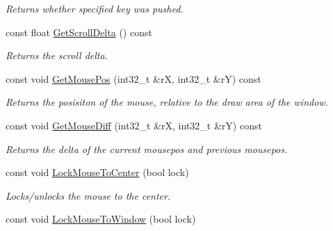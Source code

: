 \begin{DoxyCompactItemize}
\begin{DoxyCompactList}\small\item\em Returns whether specified key was pushed. \end{DoxyCompactList}\item 
const float \hyperlink{class_ensum_1_1_input_1_1_input_af4f20a422c08783172a6f4db7e995b03}{Get\+Scroll\+Delta} () const 
\begin{DoxyCompactList}\small\item\em Returns the scroll delta. \end{DoxyCompactList}\item 
const void \hyperlink{class_ensum_1_1_input_1_1_input_acb4d3ba082c4fd53984768eab378baba}{Get\+Mouse\+Pos} (int32\+\_\+t \&rX, int32\+\_\+t \&rY) const 
\begin{DoxyCompactList}\small\item\em Returns the posisiton of the mouse, relative to the draw area of the window. \end{DoxyCompactList}\item 
const void \hyperlink{class_ensum_1_1_input_1_1_input_aff8bcbdd6fc2c885259b4739d2102a36}{Get\+Mouse\+Diff} (int32\+\_\+t \&rX, int32\+\_\+t \&rY) const \hypertarget{class_ensum_1_1_input_1_1_input_aff8bcbdd6fc2c885259b4739d2102a36}{}\label{class_ensum_1_1_input_1_1_input_aff8bcbdd6fc2c885259b4739d2102a36}

\begin{DoxyCompactList}\small\item\em Returns the delta of the current mousepos and previous mousepos. \end{DoxyCompactList}\item 
const void \hyperlink{class_ensum_1_1_input_1_1_input_aeccd4757b81fa91776006f3193cf1899}{Lock\+Mouse\+To\+Center} (bool lock)\hypertarget{class_ensum_1_1_input_1_1_input_aeccd4757b81fa91776006f3193cf1899}{}\label{class_ensum_1_1_input_1_1_input_aeccd4757b81fa91776006f3193cf1899}

\begin{DoxyCompactList}\small\item\em Locks/unlocks the mouse to the center. \end{DoxyCompactList}\item 
const void \hyperlink{class_ensum_1_1_input_1_1_input_a99e2d54f15ba9449057d0850e8c9c752}{Lock\+Mouse\+To\+Window} (bool lock)\hypertarget{class_ensum_1_1_input_1_1_input_a99e2d54f15ba9449057d0850e8c9c752}{}\label{class_ensum_1_1_input_1_1_input_a99e2d54f15ba9449057d0850e8c9c752}


\end{DoxyCompactItemize}
